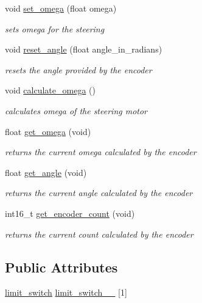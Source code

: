 \begin{DoxyCompactItemize}
void \mbox{\hyperlink{classsteering_a3f041a24795b6f4f886f46ca23dbc3e6}{set\+\_\+omega}} (float omega)
\begin{DoxyCompactList}\small\item\em sets omega for the steering \end{DoxyCompactList}\item 
void \mbox{\hyperlink{classsteering_ab0fb97c4af86a1d5ed668a58fba15ba3}{reset\+\_\+angle}} (float angle\+\_\+in\+\_\+radians)
\begin{DoxyCompactList}\small\item\em resets the angle provided by the encoder \end{DoxyCompactList}\item 
void \mbox{\hyperlink{classsteering_ae5a6bb4e5cb24e22d75723d0f8f10295}{calculate\+\_\+omega}} ()
\begin{DoxyCompactList}\small\item\em calculates omega of the steering motor \end{DoxyCompactList}\item 
float \mbox{\hyperlink{classsteering_a925978d3d3c42042b56d52a2dc049371}{get\+\_\+omega}} (void)
\begin{DoxyCompactList}\small\item\em returns the current omega calculated by the encoder \end{DoxyCompactList}\item 
float \mbox{\hyperlink{classsteering_aa2e30069b2a7d5ec7c4d8eeb0e30da32}{get\+\_\+angle}} (void)
\begin{DoxyCompactList}\small\item\em returns the current angle calculated by the encoder \end{DoxyCompactList}\item 
int16\+\_\+t \mbox{\hyperlink{classsteering_ae32b701e46af6861f02b59aeb64beb0c}{get\+\_\+encoder\+\_\+count}} (void)
\begin{DoxyCompactList}\small\item\em returns the current count calculated by the encoder \end{DoxyCompactList}\end{DoxyCompactItemize}
\subsection*{Public Attributes}
\begin{DoxyCompactItemize}
\item 
\mbox{\hyperlink{structlimit__switch}{limit\+\_\+switch}} \mbox{\hyperlink{classsteering_a8f20b7cbd6755817c0ac42370d91d173}{limit\+\_\+switch\+\_\+\+\_\+}} \mbox{[}1\mbox{]}
\end{DoxyCompactItemize}
